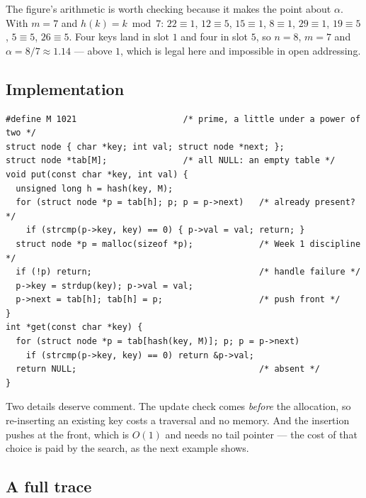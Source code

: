 \documentclass[11pt]{article}
\begin{document}
The figure's arithmetic is worth checking because it makes the point about $\alpha$. With $m = 7$ and $h(k) = k \bmod 7$: $22 \equiv 1$, $12 \equiv 5$, $15 \equiv 1$, $8 \equiv 1$, $29 \equiv 1$, $19 \equiv 5$, $5 \equiv 5$, $26 \equiv 5$. Four keys land in slot $1$ and four in slot $5$, so $n = 8$, $m = 7$ and $\alpha = 8/7 \approx 1.14$ --- above $1$, which is legal here and impossible in open addressing.

\subsection{Implementation}

\begin{verbatim}
#define M 1021                     /* prime, a little under a power of two */
struct node { char *key; int val; struct node *next; };
struct node *tab[M];               /* all NULL: an empty table */
void put(const char *key, int val) {
  unsigned long h = hash(key, M);
  for (struct node *p = tab[h]; p; p = p->next)   /* already present? */
    if (strcmp(p->key, key) == 0) { p->val = val; return; }
  struct node *p = malloc(sizeof *p);             /* Week 1 discipline */
  if (!p) return;                                 /* handle failure */
  p->key = strdup(key); p->val = val;
  p->next = tab[h]; tab[h] = p;                   /* push front */
}
int *get(const char *key) {
  for (struct node *p = tab[hash(key, M)]; p; p = p->next)
    if (strcmp(p->key, key) == 0) return &p->val;
  return NULL;                                    /* absent */
}
\end{verbatim}

Two details deserve comment. The update check comes \emph{before} the allocation, so re-inserting an existing key costs a traversal and no memory. And the insertion pushes at the front, which is $O(1)$ and needs no tail pointer --- the cost of that choice is paid by the search, as the next example shows.

\subsection{A full trace}
\end{document}
